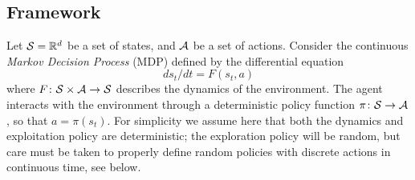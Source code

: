 \subsection{Framework}





      
Let ${\cal S} = \mathbb{R}^d$ be a set of states, and ${\cal A}$ be a set of
actions. Consider the continuous \emph{Markov Decision Process} (MDP) defined by the differential equation %
        \begin{equation}
	\label{eq:diffusion}
	ds_t/dt = F(s_t, a) %
              \end{equation}
where $F\colon {\cal S}\times{\cal A}\rightarrow {\cal S}$ describes
the dynamics of the environment. The agent interacts with the environment through a deterministic policy function
$\pi \colon {\cal S} \rightarrow {\cal A}$, so that $a=\pi(s_t)$. 
For simplicity we assume here that both the dynamics and exploitation policy are
deterministic; the exploration policy will be random, but care must be
taken to properly define random policies with
discrete actions in continuous time, see below.

